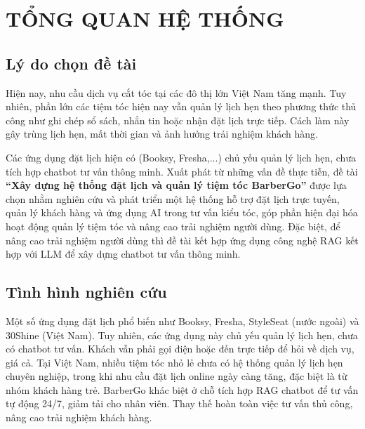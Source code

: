 \chapter{TỔNG QUAN HỆ THỐNG}


\section{ Lý do chọn đề tài}
Hiện nay, nhu cầu dịch vụ cắt tóc tại các đô thị lớn Việt Nam tăng mạnh. Tuy nhiên, phần lớn các tiệm tóc hiện nay vẫn quản lý lịch hẹn theo phương thức thủ công như ghi chép sổ sách, nhắn tin hoặc nhận đặt lịch trực tiếp.
 Cách làm này gây trùng lịch hẹn, mất thời gian và ảnh hưởng trải nghiệm khách hàng.

Các ứng dụng đặt lịch hiện có (Booksy, Fresha,...) chủ yếu quản lý lịch hẹn, chưa tích hợp chatbot tư vấn thông minh.
Xuất phát từ những vấn đề thực tiễn, đề tài \textbf{``Xây dựng hệ thống đặt lịch và quản lý tiệm tóc BarberGo''} được lựa chọn nhằm nghiên cứu và phát triển một hệ thống hỗ trợ đặt lịch trực tuyến, quản lý khách hàng và ứng dụng AI trong tư vấn kiểu tóc, góp phần hiện đại hóa hoạt động quản lý tiệm tóc và nâng cao trải nghiệm người dùng.
Đặc biệt, để nâng cao trải nghiệm người dùng thì đề tài kết hợp ứng dụng công nghệ RAG kết hợp với LLM để xây dựng chatbot tư vấn thông minh.

\section{ Tình hình nghiên cứu}
Một số ứng dụng đặt lịch phổ biến như Booksy, Fresha, StyleSeat (nước ngoài) 
và 30Shine (Việt Nam).
Tuy nhiên, các ứng dụng này chủ yếu quản lý lịch hẹn, chưa có chatbot tư vấn. 
Khách vẫn phải gọi điện hoặc đến trực tiếp để hỏi về dịch vụ, giá cả.
Tại Việt Nam, nhiều tiệm tóc nhỏ lẻ chưa có hệ thống quản lý lịch hẹn chuyên nghiệp, trong khi nhu cầu đặt lịch online ngày càng tăng, đặc biệt là từ nhóm khách hàng trẻ.
 BarberGo khác biệt ở chỗ tích hợp RAG chatbot để tư vấn tự động 24/7, 
giảm tải cho nhân viên. Thay thế hoàn toàn việc tư vấn thủ công, nâng cao trải nghiệm khách hàng.

